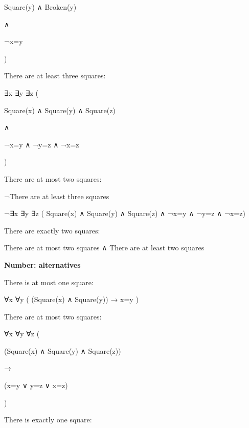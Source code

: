 \documentclass[12pt]{extarticle}
\begin{document}
\begin{multicols*}{3}
\hspace{10mm} Square(y) ∧ Broken(y)
 
\hspace{10mm} ∧
 
\hspace{10mm} ¬x=y
 
\hspace{5mm} )
 
There are at least three squares:
 
\hspace{5mm} ∃x ∃y ∃z (
 
\hspace{10mm} Square(x) ∧ Square(y) ∧ Square(z)
 
\hspace{10mm} ∧
 
\hspace{10mm} ¬x=y ∧ ¬y=z ∧ ¬x=z
 
\hspace{5mm} )
 
There are at most two squares:
 
\hspace{5mm} ¬There are at least three squares
 
\hspace{5mm} ¬∃x ∃y ∃z ( Square(x) ∧ Square(y) ∧ Square(z) ∧ ¬x=y ∧ ¬y=z ∧ ¬x=z)
 
There are exactly two squares:
 
\hspace{5mm} There are at most two squares ∧ There are at least two squares
 
\textbf{Number: alternatives}
 
There is at most one square:
 
\hspace{5mm} ∀x ∀y ( (Square(x) ∧ Square(y)) → x=y )
 
There are at most two squares:
 
\hspace{5mm} ∀x ∀y ∀z (
 
\hspace{10mm} (Square(x) ∧ Square(y) ∧ Square(z))
 
\hspace{10mm} →
 
\hspace{10mm} (x=y ∨ y=z ∨ x=z)
 
\hspace{5mm} )
 
There is exactly one square:
 

\end{multicols*}
\end{document}

